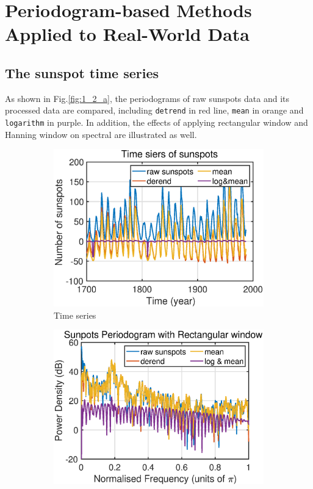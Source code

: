 \section{Periodogram-based Methods Applied to Real-World Data}
\subsection{The sunspot time series}
As shown in Fig.\ref{fig:1_2_a}, the periodograms of raw sunspots data and its processed data are compared, including \texttt{detrend} in red line, \texttt {mean} in orange and \texttt {logarithm} in purple. In addition, the effects of applying rectangular window and Hanning window on spectral are illustrated as well. 
\begin{figure}[htbp]
     \centering
      \hspace{-0.4cm}
     \begin{subfigure}[b]{0.33\textwidth}
         \centering
         \includegraphics[width=\textwidth]{fig/12/12a1.eps}
         \caption{Time series}
         \label{fig:raw}
     \end{subfigure}
      \hspace{-0.4cm}
     \begin{subfigure}[b]{0.33\textwidth}
         \centering
         \includegraphics[width=\textwidth]{fig/12/12a2.eps}

\end{subfigure}
\end{figure}

